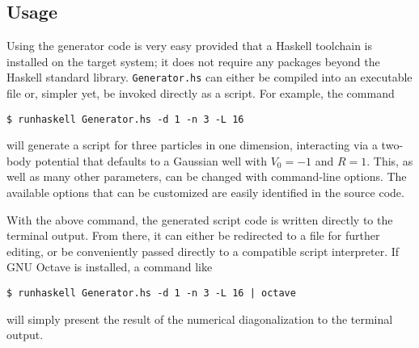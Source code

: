 \documentclass[aps,singlecolumn,superscriptaddress,nofootinbib,tightenlines,
preprintnumbers,showkeys]{revtex4-1}
\begin{document}
\subsection{Usage}
Using the generator code is very easy provided that a Haskell toolchain is 
installed on the target system; it does not require any packages beyond the 
Haskell standard library.  \texttt{Generator.hs} can either be compiled into an 
executable file or, simpler yet, be invoked directly as a script.  For example, 
the command
%
\begin{verbatim}
$ runhaskell Generator.hs -d 1 -n 3 -L 16
\end{verbatim}
%
will generate a script for three particles in one dimension, interacting via a 
two-body potential that defaults to a Gaussian well with $V_0={-}1$ and $R=1$.  
This, as well as many other parameters, can be changed with command-line 
options.  The available options that can be customized are easily identified in 
the source code.

With the above command, the generated script code is written directly to the 
terminal output.  From there, it can either be redirected to a file for further 
editing, or be conveniently passed directly to a compatible script interpreter. 
If GNU Octave is installed, a command like
%
\begin{verbatim}
$ runhaskell Generator.hs -d 1 -n 3 -L 16 | octave 
\end{verbatim}
%
will simply present the result of the numerical diagonalization to the terminal
output.
\end{document}
